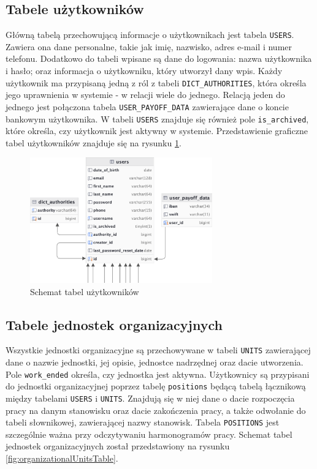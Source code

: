 \subsection{Tabele użytkowników}

Główną tabelą przechowującą informacje o użytkownikach jest tabela \texttt{USERS}. Zawiera ona dane personalne, takie jak imię, nazwisko, adres e-mail i numer telefonu. Dodatkowo do tabeli wpisane są dane do logowania: nazwa użytkownika i hasło; oraz informacja o użytkowniku, który  utworzył dany wpis. Każdy użytkownik ma przypisaną jedną z ról z tabeli \texttt{DICT\_AUTHORITIES}, która określa jego uprawnienia w systemie - w relacji wiele do jednego. Relacją jeden do jednego jest połączona tabela \texttt{USER\_PAYOFF\_DATA} zawierające dane o koncie bankowym użytkownika. W tabeli \texttt{USERS} znajduje się również pole \texttt{is\_archived}, które określa, czy użytkownik jest aktywny w systemie. Przedstawienie graficzne tabel użytkowników znajduje się na rysunku \ref{fig:usersTable}.

\begin{figure}[H]
    \centering
    \includegraphics[width=0.7\textwidth]{graf/usersTable.png}
    \caption{Schemat tabel użytkowników}
    \label{fig:usersTable}
\end{figure}

\subsection{Tabele jednostek organizacyjnych}



Wszystkie jednostki organizacyjne są przechowywane w tabeli \texttt{UNITS} zawierającej dane o nazwie jednostki, jej opisie, jednostce nadrzędnej oraz dacie utworzenia. Pole \texttt{work\_ended} określa, czy jednostka jest aktywna. Użytkownicy są przypisani do jednostki organizacyjnej poprzez tabelę \texttt{positions} będącą tabelą łącznikową między tabelami \texttt{USERS} i \texttt{UNITS}. Znajdują się w niej dane o dacie rozpoczęcia pracy na danym stanowisku oraz dacie zakończenia pracy, a także odwołanie do tabeli słownikowej, zawierającej nazwy stanowisk. Tabela \texttt{POSITIONS} jest szczególnie ważna przy odczytywaniu harmonogramów pracy. Schemat tabel jednostek organizacyjnych został przedstawiony na rysunku \ref{fig:organizationalUnitsTable}.


